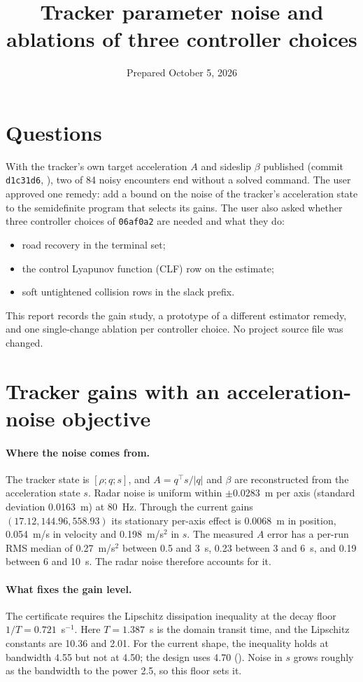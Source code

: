 \documentclass[11pt]{article}
\title{Tracker parameter noise and ablations of three controller choices}
\date{Prepared October 5, 2026}
\begin{document}
\maketitle

\section{Questions}
With the tracker's own target acceleration $A$ and sideslip $\beta$
published (commit \texttt{d1c31d6},
), two of 84 noisy encounters
end without a solved command. The user approved one remedy: add a bound on
the noise of the tracker's acceleration state to the semidefinite program
that selects its gains. The user also asked whether three controller choices
of \texttt{06af0a2} are needed and what they do:
\begin{itemize}
\item road recovery in the terminal set;
\item the control Lyapunov function (CLF) row on the estimate;
\item soft untightened collision rows in the slack prefix.
\end{itemize}
This report records the gain study, a prototype of a different estimator
remedy, and one single-change ablation per controller choice. No project
source file was changed.

\section{Tracker gains with an acceleration-noise objective}
\paragraph{Where the noise comes from.} The tracker state is $[\rho;q;s]$, and
$A=q^\top s/|q|$ and $\beta$ are reconstructed from the acceleration state
$s$. Radar noise is uniform within $\pm0.0283$~m per axis (standard
deviation 0.0163~m) at 80~Hz. Through the current gains $(17.12, 144.96,
558.93)$ its stationary per-axis effect is 0.0068~m in position,
0.054~m/s in velocity and 0.198~m/s$^2$ in $s$. The measured $A$ error has
a per-run RMS median of 0.27~m/s$^2$ between 0.5 and 3~s, 0.23 between 3 and
6~s, and 0.19 between 6 and 10~s. The radar noise therefore accounts for it.

\paragraph{What fixes the gain level.} The certificate requires the
Lipschitz dissipation inequality at the decay floor $1/T=0.721$~s$^{-1}$.
Here $T=1.387$~s is the domain transit time, and the Lipschitz constants are
10.36 and 2.01. For the current shape, the inequality holds at bandwidth
4.55 but not at 4.50; the design uses 4.70
().
Noise in $s$ grows roughly as the bandwidth to the power 2.5, so this floor
sets it.
\end{document}
